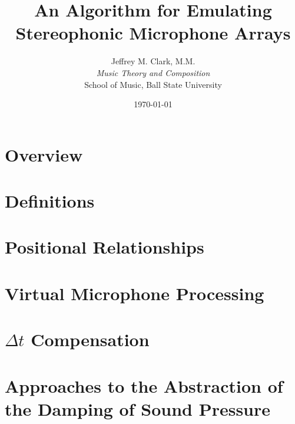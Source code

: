 \documentclass[fleqn, 10pt, letterpaper]{IEEEtran}
\title{An Algorithm for Emulating Stereophonic Microphone Arrays}
\date{\today}
\author{Jeffrey M. Clark, M.M. \\ \textit{Music Theory and Composition} \\ School of Music,  Ball State University}
\begin{document}
\maketitle



\section{Overview}



\section{Definitions}



\section{Positional Relationships}

	

\section{Virtual Microphone Processing}



\section{$\Delta{}t$ Compensation}



\section{Approaches to the Abstraction of the Damping of Sound Pressure}




\nocite{*}


\end{document}
